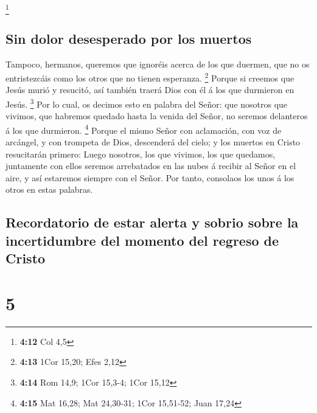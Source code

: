 \footnote{\textbf{4:12} Col 4,5}

\hypertarget{sin-dolor-desesperado-por-los-muertos}{%
\subsection{Sin dolor desesperado por los
muertos}\label{sin-dolor-desesperado-por-los-muertos}}

 Tampoco, hermanos, queremos que ignoréis acerca de los
que duermen, que no os entristezcáis como los otros que no tienen
esperanza. \footnote{\textbf{4:13} 1Cor 15,20; Efes 2,12}
 Porque si creemos que Jesús murió y resucitó, así
también traerá Dios con él á los que durmieron en Jesús. \footnote{\textbf{4:14}
  Rom 14,9; 1Cor 15,3-4; 1Cor 15,12}  Por lo cual, os
decimos esto en palabra del Señor: que nosotros que vivimos, que
habremos quedado hasta la venida del Señor, no seremos delanteros á los
que durmieron. \footnote{\textbf{4:15} Mat 16,28; Mat 24,30-31; 1Cor
  15,51-52; Juan 17,24}  Porque el mismo Señor con
aclamación, con voz de arcángel, y con trompeta de Dios, descenderá del
cielo; y los muertos en Cristo resucitarán primero: 
Luego nosotros, los que vivimos, los que quedamos, juntamente con ellos
seremos arrebatados en las nubes á recibir al Señor en el aire, y así
estaremos siempre con el Señor.  Por tanto, consolaos los
unos á los otros en estas palabras.

\hypertarget{recordatorio-de-estar-alerta-y-sobrio-sobre-la-incertidumbre-del-momento-del-regreso-de-cristo}{%
\subsection{Recordatorio de estar alerta y sobrio sobre la incertidumbre
del momento del regreso de
Cristo}\label{recordatorio-de-estar-alerta-y-sobrio-sobre-la-incertidumbre-del-momento-del-regreso-de-cristo}}

\hypertarget{section-4}{%
\section{5}\label{section-4}}

